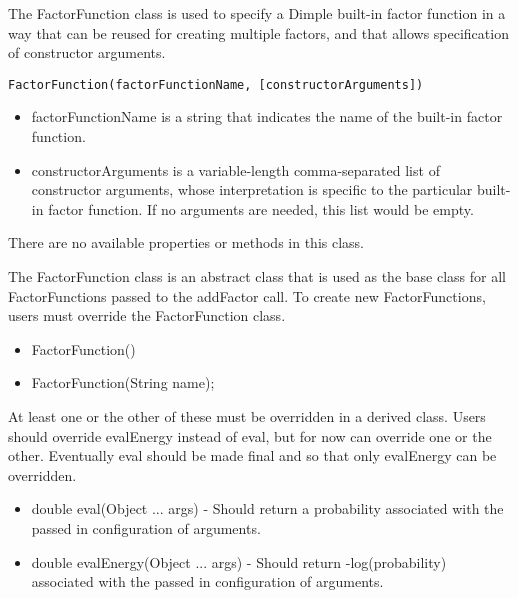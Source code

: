 \ifmatlab

The FactorFunction class is used to specify a Dimple built-in factor function in a way that can be reused for creating multiple factors, and that allows specification of constructor arguments.


\begin{lstlisting}
FactorFunction(factorFunctionName, [constructorArguments])
\end{lstlisting}

\begin{itemize}
\item factorFunctionName is a string that indicates the name of the built-in factor function.
\item constructorArguments is a variable-length comma-separated list of constructor arguments, whose interpretation is specific to the particular built-in factor function.  If no arguments are needed, this list would be empty.
\end{itemize}

There are no available properties or methods in this class.

\fi

\ifjava
The FactorFunction class is an abstract class that is used as the base class for all FactorFunctions passed to the addFactor call.  To create new FactorFunctions, users must override the FactorFunction class.


\begin{itemize}
\item FactorFunction()
\item FactorFunction(String name);
\end{itemize}


At least one or the other of these must be overridden in a derived class.  Users should override evalEnergy instead of eval, but for now can override one or the other.  Eventually eval should be made final and so that only evalEnergy can be overridden.

\begin{itemize}
\item double eval(Object ... args) - Should return a probability associated with the passed in configuration of arguments.
\item double evalEnergy(Object ... args) - Should return -log(probability) associated with the passed in configuration of arguments.
\end{itemize}

